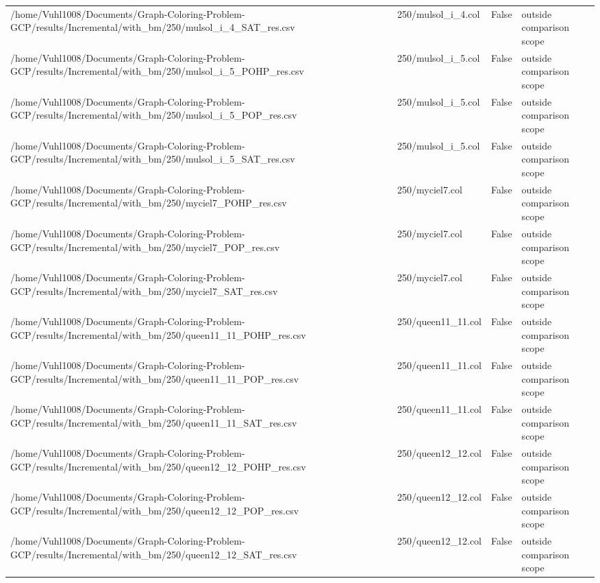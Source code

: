 \begin{table}[htbp]
\begin{tabular}{llll}
/home/Vuhl1008/Documents/Graph-Coloring-Problem-GCP/results/Incremental/with\_bm/250/mulsol\_i\_4\_SAT\_res.csv & 250/mulsol\_i\_4.col & False & outside comparison scope \\
/home/Vuhl1008/Documents/Graph-Coloring-Problem-GCP/results/Incremental/with\_bm/250/mulsol\_i\_5\_POHP\_res.csv & 250/mulsol\_i\_5.col & False & outside comparison scope \\
/home/Vuhl1008/Documents/Graph-Coloring-Problem-GCP/results/Incremental/with\_bm/250/mulsol\_i\_5\_POP\_res.csv & 250/mulsol\_i\_5.col & False & outside comparison scope \\
/home/Vuhl1008/Documents/Graph-Coloring-Problem-GCP/results/Incremental/with\_bm/250/mulsol\_i\_5\_SAT\_res.csv & 250/mulsol\_i\_5.col & False & outside comparison scope \\
/home/Vuhl1008/Documents/Graph-Coloring-Problem-GCP/results/Incremental/with\_bm/250/myciel7\_POHP\_res.csv & 250/myciel7.col & False & outside comparison scope \\
/home/Vuhl1008/Documents/Graph-Coloring-Problem-GCP/results/Incremental/with\_bm/250/myciel7\_POP\_res.csv & 250/myciel7.col & False & outside comparison scope \\
/home/Vuhl1008/Documents/Graph-Coloring-Problem-GCP/results/Incremental/with\_bm/250/myciel7\_SAT\_res.csv & 250/myciel7.col & False & outside comparison scope \\
/home/Vuhl1008/Documents/Graph-Coloring-Problem-GCP/results/Incremental/with\_bm/250/queen11\_11\_POHP\_res.csv & 250/queen11\_11.col & False & outside comparison scope \\
/home/Vuhl1008/Documents/Graph-Coloring-Problem-GCP/results/Incremental/with\_bm/250/queen11\_11\_POP\_res.csv & 250/queen11\_11.col & False & outside comparison scope \\
/home/Vuhl1008/Documents/Graph-Coloring-Problem-GCP/results/Incremental/with\_bm/250/queen11\_11\_SAT\_res.csv & 250/queen11\_11.col & False & outside comparison scope \\
/home/Vuhl1008/Documents/Graph-Coloring-Problem-GCP/results/Incremental/with\_bm/250/queen12\_12\_POHP\_res.csv & 250/queen12\_12.col & False & outside comparison scope \\
/home/Vuhl1008/Documents/Graph-Coloring-Problem-GCP/results/Incremental/with\_bm/250/queen12\_12\_POP\_res.csv & 250/queen12\_12.col & False & outside comparison scope \\
/home/Vuhl1008/Documents/Graph-Coloring-Problem-GCP/results/Incremental/with\_bm/250/queen12\_12\_SAT\_res.csv & 250/queen12\_12.col & False & outside comparison scope \\

\end{tabular}
\end{table}
